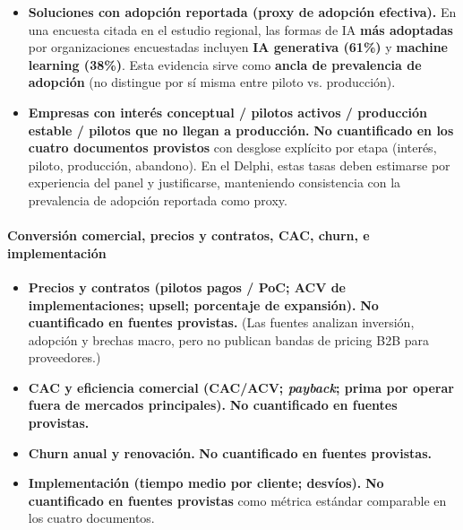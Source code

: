 \begin{itemize}
  \item \textbf{Soluciones con adopción reportada (proxy de adopción efectiva).} En una encuesta citada en el estudio regional, las formas de IA \textbf{más adoptadas} por organizaciones encuestadas incluyen \textbf{IA generativa (61\%)} y \textbf{machine learning (38\%)}. Esta evidencia sirve como \textbf{ancla de prevalencia de adopción} (no distingue por sí misma entre piloto vs. producción). \parencite{GerosaHermansen2025EconomicWorkforceAI}

  \item \textbf{Empresas con interés conceptual / pilotos activos / producción estable / pilotos que no llegan a producción.} \textbf{No cuantificado en los cuatro documentos provistos} con desglose explícito por etapa (interés, piloto, producción, abandono). En el Delphi, estas tasas deben estimarse por experiencia del panel y justificarse, manteniendo consistencia con la prevalencia de adopción reportada como proxy. \parencite{GerosaHermansen2025EconomicWorkforceAI}
\end{itemize}

\paragraph{Conversión comercial, precios y contratos, CAC, churn, e implementación}

\begin{itemize}

  \item \textbf{Precios y contratos (pilotos pagos / PoC; ACV de implementaciones; upsell; porcentaje de expansión).} \textbf{No cuantificado en fuentes provistas.} (Las fuentes analizan inversión, adopción y brechas macro, pero no publican bandas de pricing B2B para proveedores.)

  \item \textbf{CAC y eficiencia comercial (CAC/ACV; \textit{payback}; prima por operar fuera de mercados principales).} \textbf{No cuantificado en fuentes provistas.}

  \item \textbf{Churn anual y renovación.} \textbf{No cuantificado en fuentes provistas.}

  \item \textbf{Implementación (tiempo medio por cliente; desvíos).} \textbf{No cuantificado en fuentes provistas} como métrica estándar comparable en los cuatro documentos.
\end{itemize}

